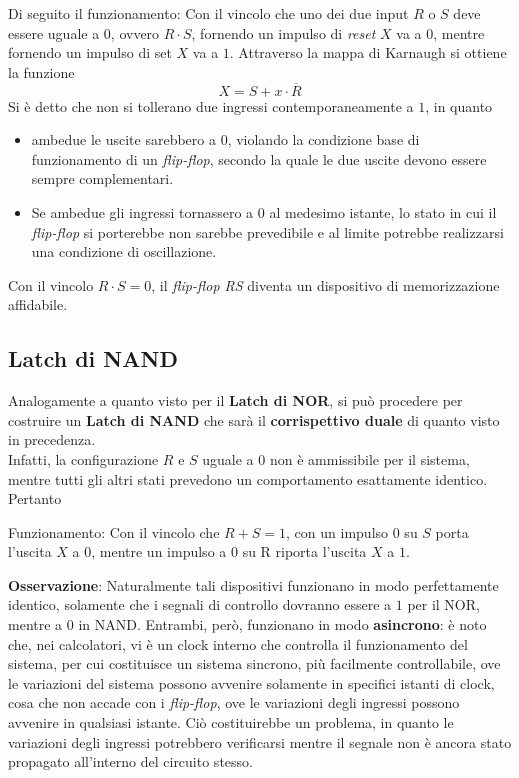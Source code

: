 \documentclass[a4paper]{extarticle}
\begin{document}
Di seguito il funzionamento: Con il vincolo che uno dei due input \(R\) o \(S\) deve essere uguale a \(0\), ovvero \(R \cdot S\), fornendo un impulso di \textit{reset} \(X\) va a \(0\), mentre fornendo un impulso di set \(X\) va a \(1\). Attraverso la mappa di Karnaugh si ottiene la funzione
\[X = S + x \cdot \overline{R}\]
Si è detto che non si tollerano due ingressi contemporaneamente a \(1\), in quanto
\begin{itemize}
    \item ambedue le uscite sarebbero a \(0\), violando la condizione base di funzionamento di un \textit{flip-flop}, secondo la quale le due uscite devono essere sempre complementari.

    \item Se ambedue gli ingressi tornassero a \(0\) al medesimo istante, lo stato in cui il \textit{flip-flop} si porterebbe non sarebbe prevedibile e al limite potrebbe realizzarsi una condizione di oscillazione.
\end{itemize}
Con il vincolo \(R \cdot S = 0\), il \textit{flip-flop RS} diventa un dispositivo di memorizzazione affidabile.

\subsection{Latch di NAND}
Analogamente a quanto visto per il \textbf{Latch di NOR}, si può procedere per costruire un \textbf{Latch di NAND} che sarà il \textbf{corrispettivo duale} di quanto visto in precedenza.\\
Infatti, la configurazione \(R\) e \(S\) uguale a \(0\) non è ammissibile per il sistema, mentre tutti gli altri stati prevedono un comportamento esattamente identico. Pertanto

Funzionamento: Con il vincolo che \(R + S = 1\), con un impulso \(0\) su \(S\) porta l'uscita \(X\) a \(0\), mentre un impulso a \(0\) su R riporta l'uscita \(X\) a \(1\).

\vspace{1em}
\noindent
\textbf{Osservazione}: Naturalmente tali dispositivi funzionano in modo perfettamente identico, solamente che i segnali di controllo dovranno essere a \(1\) per il NOR, mentre a \(0\) in NAND. Entrambi, però, funzionano in modo \textbf{asincrono}: è noto che, nei calcolatori, vi è un clock interno che controlla il funzionamento del sistema, per cui costituisce un sistema sincrono, più facilmente controllabile, ove le variazioni del sistema possono avvenire solamente in specifici istanti di clock, cosa che non accade con i \textit{flip-flop}, ove le variazioni degli ingressi possono avvenire in qualsiasi istante. Ciò costituirebbe un problema, in quanto le variazioni degli ingressi potrebbero verificarsi mentre il segnale non è ancora stato propagato all'interno del circuito stesso.
\end{document}
